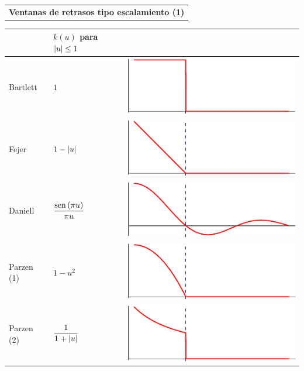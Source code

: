 \begin{SidewaysTable}
\centering
{}
\begin{tabular}{c}
\textbf{Ventanas de retrasos tipo escalamiento (1)}
\vspace{1em}
\end{tabular}

{
\begin{tabular}{lll}
\toprule
& $k(u)$ para $\left| u \right| \leq 1$ & \\
\midrule
Bartlett &
$\displaystyle 
1 
$
& \includegraphics[scale=.66]{./img_ventanas/ventana_bartlett.pdf}
\\
\rowcolor{gris}
Fejer &
$\displaystyle 
1-\left| u \right|
$
& \includegraphics[scale=.66]{./img_ventanas/ventana_fejer.pdf}
\\
Daniell &
$\displaystyle 
\frac{\mathrm{sen}\left( \pi u \right)}{\pi u}
$
& \includegraphics[scale=.66]{./img_ventanas/ventana_daniell.pdf}
\\
\rowcolor{gris}
Parzen (1) &
$\displaystyle 
1-u^{2}
$
& \includegraphics[scale=.66]{./img_ventanas/ventana_parzen1.pdf}
\\
Parzen (2) &
$\displaystyle 
\frac{1}{1+\left| u \right|}
$
& \includegraphics[scale=.66]{./img_ventanas/ventana_parzen2.pdf}

\end{tabular}}
\end{SidewaysTable}
